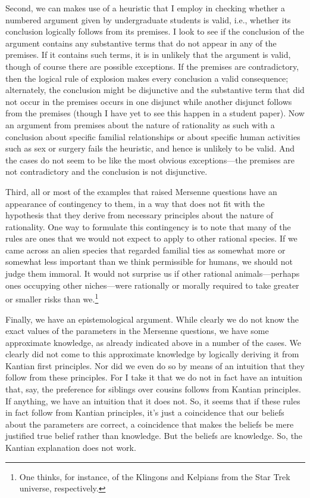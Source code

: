 Second, we can makes use of a heuristic that I employ in checking whether a numbered argument 
given by undergraduate students is valid, i.e., whether its conclusion logically follows from its premises.
I look to see if the conclusion of the
argument contains any substantive terms that do not appear in any of the premises. If it contains such terms, it is in unlikely that the argument is valid, though of course there are possible exceptions. If the premises are contradictory, then the logical rule of explosion makes every conclusion a valid consequence; alternately, the conclusion might be disjunctive and the
substantive term that did not occur in the premises occurs in one disjunct while another disjunct follows from the premises (though 
I have yet to see this happen in a student paper). Now an argument from premises about the nature of rationality as such
with a conclusion about specific familial relationships or about specific human activities such as sex or surgery fails the heuristic,
and hence is unlikely to be valid. And the cases do not seem to be like the most obvious exceptions---the premises are not contradictory
and the conclusion is not disjunctive.

Third, all or most of the examples that raised Mersenne questions have an appearance of contingency to them, in a way that does not
fit with the hypothesis that they derive from necessary principles about the nature of rationality. One way to formulate this
contingency is to note that many of the rules are ones that we would not expect to apply to other rational species. If we
came across an alien species that regarded familial ties as somewhat more or somewhat less important than we think permissible
for humans, we should not judge them immoral. It would not surprise us if other rational animals---perhaps ones occupying
other niches---were rationally or morally required to take greater or smaller risks than we.\footnote{One thinks, for instance,
of the Klingons and Kelpians from the Star Trek universe, respectively.}

Finally, we have an epistemological argument. While clearly we do not know the exact values of the parameters in the Mersenne
questions, we have some approximate knowledge, as already indicated above in a number of the cases. We clearly did not come
to this approximate knowledge by logically deriving it from Kantian first principles. Nor did we even do so by means of an
intuition that they follow from these principles. For I take it that we do not in fact have an intuition that, say, the
preference for siblings over cousins follows from Kantian principles. If anything, we have an intuition that it does not.
So, it seems that if these rules in fact follow from Kantian principles, it's just a coincidence that our beliefs about
the parameters are correct, a coincidence that makes the beliefs be mere justified true belief rather than
knowledge. But the beliefs are knowledge. So, the Kantian explanation does not work. 

